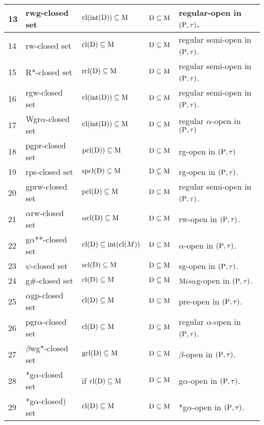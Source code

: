 {\begin{longtable}{@{}|p{.9cm}|>{\raggedright}p{5cm}|>{\centering}p{2.5cm}|>{\centering}p{1.7cm}|>{\centering}p{2.8cm}|@{}}
\hline
13 & rwg-closed set \cite{Nagaveni6} & $\mathrm{cl}(\mbox{int}(\mathrm{D})) \subseteq \mathrm{M}$ & $\mathrm{D} \subseteq \mathrm{M}$ & regular-open in $(\mathrm{P}, \tau)$.\tabularnewline
\hline
14 & rw-closed set \cite{Benchalli} & $\mathrm{cl}(\mathrm{D}) \subseteq \mathrm{M}$ & $\mathrm{D} \subseteq \mathrm{M}$ & regular semi-open in $(\mathrm{P}, \tau)$.\tabularnewline
\hline
15 & R*-closed set \cite{Janaki3} & $\mathrm{rcl}(\mathrm{D}) \subseteq \mathrm{M}$ & $\mathrm{D} \subseteq \mathrm{M}$ & regular semi-open in $(\mathrm{P}, \tau)$.\tabularnewline
\hline
16 & rgw-closed set \cite{Sanjay} & $\mathrm{cl}(\mbox{int}(\mathrm{D}))\subseteq \mathrm{M}$ & $\mathrm{D} \subseteq \mathrm{M}$ & regular semi-open in $(\mathrm{P}, \tau)$.\tabularnewline
\hline
17 & Wgr$\alpha$-closed set \cite{Janaki1} & $\mathrm{cl}(\mbox{int}(\mathrm{D})) \subseteq \mathrm{M}$ & $\mathrm{D} \subseteq \mathrm{M}$ & regular $\alpha$-open in $(\mathrm{P}, \tau)$\tabularnewline
\hline
18 & pgpr-closed set \cite{Anitha} & $\mathrm{pcl}(\mathrm{D})) \subseteq \mathrm{M}$ & $\mathrm{D} \subseteq \mathrm{M}$ & rg-open in $(\mathrm{P}, \tau)$\tabularnewline
\hline
19 & rps-closed set \cite{Shyala} & $\mathrm{spcl}(\mathrm{D}) \subseteq \mathrm{M}$ & $\mathrm{D} \subseteq \mathrm{M}$ & rg-open in $(\mathrm{P}, \tau)$.\tabularnewline
\hline
20 & gprw-closed set \cite{Sanjay1} & $\mathrm{pcl}(\mathrm{D}) \subseteq \mathrm{M}$ & $\mathrm{D} \subseteq \mathrm{M}$ & regular semi-open in $(\mathrm{P}, \tau)$.\tabularnewline
\hline
21 & $\alpha$rw-closed set \cite{Wali3} & $\alpha\mathrm{cl}(\mathrm{D}) \subseteq \mathrm{M}$ & $\mathrm{D}\subseteq\mathrm{M}$ & rw-open in $(\mathrm{P}, \tau)$.\tabularnewline
\hline
22 & g$\alpha${*}{*}-closed set \cite{key} & $\mathrm{cl}(\mathrm{D}) \subseteq\mbox{int}(\mathrm{cl}(M))$ & $\mathrm{D} \subseteq \mathrm{M}$ & $\alpha$-open in $(\mathrm{P},\tau)$.\tabularnewline
\hline
23 & $\psi$-closed set \cite{Veerakumar2} & $\mathrm{scl}(\mathrm{D}) \subseteq \mathrm{M}$ & $\mathrm{D} \subseteq \mathrm{M}$ & sg-open in $(\mathrm{P}, \tau)$.\tabularnewline
\hline
24 & g\#-closed set \cite{Veerakumar} & $\mathrm{cl}(\mathrm{D}) \subseteq \mathrm{M}$ & $\mathrm{D} \subseteq \mathrm{M}$ & $\mathrm{M} is \alpha$g-open in $(\mathrm{P}, \tau)$.\tabularnewline
\hline
25 & $\alpha$gp-closed set \cite{Navalagi2} & $\mathrm{cl}(\mathrm{D}) \subseteq \mathrm{M}$ & $\mathrm{D} \subseteq \mathrm{M}$ & pre-open in $(\mathrm{P}, \tau)$.\tabularnewline
\hline
26 & pgr$\alpha$-closed set \cite{key} & $\mathrm{cl}(\mathrm{D}) \subseteq \mathrm{M}$ & $\mathrm{D} \subseteq \mathrm{M}$ & regular $\alpha$-open in $(\mathrm{P}, \tau)$.\tabularnewline
\hline
27 & $\beta$wg*-closed set \cite{Dhanapakyam} & $\mathrm{gcl}(\mathrm{D}) \subseteq \mathrm{M}$ & $\mathrm{D} \subseteq \mathrm{M}$ & $\beta$-open in $(\mathrm{P}, \tau)$.\tabularnewline
\hline
28 & *g$\alpha$-closed set \cite{Vigneshwaran} & if $\mathrm{cl}(\mathrm{D}) \subseteq \mathrm{M}$ & $\mathrm{D} \subseteq \mathrm{M}$ & g$\alpha$-open in $(\mathrm{P},\tau)$.\tabularnewline
\hline
29 & *g$\alpha$-closed) set \cite{Vigneshwaran1} & $\mathrm{cl}(\mathrm{D}) \subseteq \mathrm{M}$ & $\mathrm{D} \subseteq \mathrm{M}$ & *g$\alpha$-open in $(\mathrm{P}, \tau)$.\tabularnewline

\end{longtable}}
